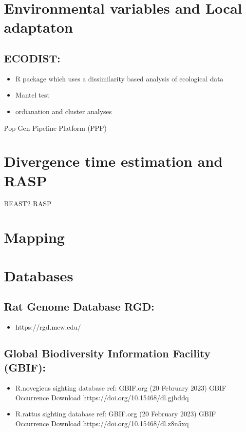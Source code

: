 \documentclass[document.tex]{subfiles}
\begin{document}
\section*{Environmental variables and Local adaptaton}

    \subsection{ECODIST: }
        \begin{itemize}
        \item R package which uses a dissimilarity based analysis of ecological data 
        \item Mantel test
        \item ordianation and cluster analyses
        \end{itemize} 


        Pop-Gen Pipeline Platform (PPP) 



\section*{Divergence time estimation and RASP}

BEAST2
RASP


\section*{Mapping}


\section*{Databases}

    \subsection{Rat Genome Database RGD: }
    \begin{itemize}
    \item https://rgd.mcw.edu/
    \end{itemize} 

    \subsection{Global Biodiversity Information Facility (GBIF): }
    \begin{itemize}
    \item R.novegicus sighting database ref: GBIF.org (20 February 2023) GBIF Occurrence Download  https://doi.org/10.15468/dl.gjbddq
    \item R.rattus sighting database ref: GBIF.org (20 February 2023) GBIF Occurrence Download https://doi.org/10.15468/dl.z8n5xq
    \end{itemize} 

    

\bib{}
    
\end{document}
